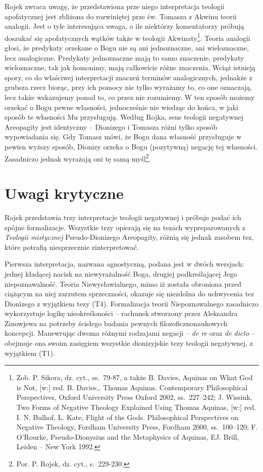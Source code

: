 Rojek zwraca uwagę, że przedstawiona prze niego interpretacja teologii
apofatycznej jest zbliżona do rozwiniętej prze św. Tomasza z Akwinu
teorii analogii. Jest o tyle interesująca uwaga, o ile niektórzy
komentatorzy próbują doszukać się apofatycznych wątków także w teologii
Akwinaty\footnote{Zob. P. Sikora, dz. cyt., ss.~79-87, a także B.
Davies, Aquinas on What God is Not, [w:] red. B. Davies,. Thomas
Aquinas. Contemporary Philosophical Perspectives, Oxford University
Press Oxford 2002, ss.~227–242; J. Wissink, Two Forms of Negative
Theology Explained Using Thomas Aquinas, [w:] red. I. N. Bulhof, L.
Kate, Flight of the Gods. Philosophical Perspectives on Negative
Theology, Fordham University Press, Fordham 2000, ss.~100--120; F.
O'Rourke, Pseudo-Dionysius and the Metaphysics of
Aquinas, EJ. Brill, Leiden -- New York 1992. }. Teoria analogii
głosi, że predykaty orzekane o Bogu nie są ani jednoznaczne, ani
wieloznaczne, lecz analogiczne. Predykaty jednoznaczne mają to samo
znaczenie, predykaty wieloznaczne, tak jak homonimy, mają całkowicie
różne znaczenia. Wciąż istnieją spory, co do właściwej interpretacji
znaczeń terminów analogicznych, jednakże z grubsza  rzecz biorąc, przy
ich pomocy nie tylko wyrażamy to, co one oznaczają, lecz także
wskazujemy ponad to, co przez nie rozumiemy. W ten sposób możemy
orzekać o Bogu pewne własności, jednocześnie nie wiedząc do końca, w
jaki sposób te własności Mu przysługują. Według Rojka, sens teologii
negatywnej Areopagity jest identyczny -- Dionizego i Tomasza różni tylko
sposób wypowiadania się. Gdy Tomasz mówi, że Bogu dana własność
przysługuje w pewien wyższy sposób, Dionizy orzeka o Bogu (pozytywną)
negację tej własności. Zasadniczo jednak wyrażają oni tę samą
myśl\footnote{Por. P. Rojek, dz. cyt., s.~229-230. }.



\clearpage
\section{Uwagi krytyczne}

Rojek przedstawia trzy interpretacje teologii negatywnej i próbuje podać
ich spójne formalizacje. Wszystkie trzy opierają się na tezach
wypreparowanych z \textit{Teologii mistycznej} Pseudo-Dionizego
Areopagity, różnią się jednak zasobem tez, które potrafią niesprzecznie
zinterpretować.

Pierwsza interpretacja, nazwana agnostyczną, podana jest w dwóch
wersjach: jednej kładącej nacisk na niewyrażalność Boga, drugiej
podkreślającej Jego niepoznawalność. Teoria Niewysławialnego, mimo iż
została obroniona przed ciążącym na niej zarzutem sprzeczności, okazuje
się niezdolna do uchwycenia tez Dionizego z wyjątkiem tezy (T4).
Formalizacja teorii Niepoznawalnego zasadniczo wykorzystuje logikę
nieokreśloności -- rachunek stworzony przez Aleksandra Zinowjewa na
potrzeby ścisłego badania pewnych filozoficznonaukowych koncepcji.
Manewrując dwoma różnymi rodzajami negacji -- \textit{de re} oraz
\textit{de dicto} -- obejmuje ona swoim zasięgiem wszystkie dionizyjskie
tezy teologii negatywnej, z wyjątkiem (T1).


